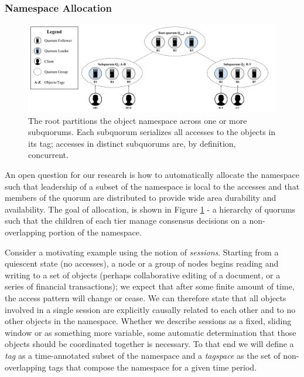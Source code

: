 \documentclass{article}
\begin{document}
\subsubsection{Namespace Allocation}
\label{sec:namespace_allocation}

\begin{figure}
    \centering
        \includegraphics[width=.9\textwidth]{figures/hierarchical}
        \caption[Hierarchical consensus partitions the namespace across subquorums]{The root partitions the object namespace across one or more subquorums. Each subquorum serializes all accesses to the objects in its tag; accesses in distinct subquorums are, by definition, concurrent.}
        \label{fig:hierarchical}
\end{figure}

An open question for our research is how to automatically allocate the namespace such that leadership of a subset of the namespace is local to the accesses and that members of the quorum are distributed to provide wide area durability and availability. The goal of allocation, is shown in Figure \ref{fig:hierarchical} - a hierarchy of quorums such that the children of each tier manage consensus decisions on a non-overlapping portion of the namespace.

Consider a motivating example using the notion of \textit{sessions}. Starting from a quiescent state (no accesses), a node or a group of nodes begins reading and writing to a set of objects (perhaps collaborative editing of a document, or a series of financial transactions); we expect that after some finite amount of time, the access pattern will change or cease. We can therefore state that all objects involved in a single session are explicitly causally related to each other and to no other objects in the namespace. Whether we describe sessions as a fixed, sliding window or as something more variable, some automatic determination that those objects should be coordinated together is necessary. To that end we will define a \textit{tag} as a time-annotated subset of the namespace and a \textit{tagspace} as the set of non-overlapping tags that compose the namespace for a given time period.
\end{document}
